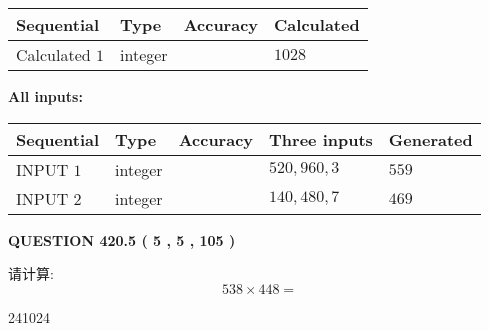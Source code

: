 \documentclass{ctexart}
\begin{document}
   
   
   
\noindent{}
   
   
  
  
\noindent\begin{tabular}{|l|l|l|l|}
\hline
 Sequential & Type & Accuracy & Calculated \\ 
\hline
 
 
  Calculated $  1 $ & integer &  & 
  $ 1028 $ 
 \\  \hline  
 \end{tabular}
   
   
   
   
\noindent\vspace{0.1in}\hspace{-0.08in} {\textbf{\Large{All inputs: }}}
   
   
  
  
\noindent\begin{tabular}{|l|l|l|l|l|}
\hline
 Sequential & Type & Accuracy & Three inputs & Generated \\ 
\hline
 
 
  INPUT $  1 $ & integer &  & $
 520
 , 
 960
 , 
 3
 $ & $ 559 $ 
 \\  \hline  
 
 
  INPUT $  2 $ & integer &  & $
 140
 , 
 480
 , 
 7
 $ & $ 469 $ 
 \\  \hline  
 \end{tabular}
   
   
  
\vspace{0.2in}
  
{\textbf{\Large{QUESTION
420.5 
 ( 5 , 5 , 105 )
}}}
  
  
 
请计算:
\begin{equation}
538  \times    %
448 = \nonumber
\end{equation}
 
 
 
\noindent{}
 
 

241024
 
 
\noindent{}
 
 

 
 
 
\noindent{}
 
\end{document}
